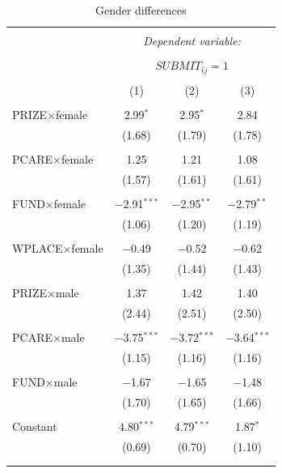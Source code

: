 \documentclass[12pt, titlepage]{article}
\begin{document}
\begin{table}
\centering
\caption{Gender differences}\label{tab: probability submitting interactions}
\begin{tabular}{@{\extracolsep{5pt}}lccc} 
\\[-1.8ex]\hline 
\hline \\[-1.8ex] 
 & \multicolumn{3}{c}{\textit{Dependent variable:}} \\ 
\cline{2-4} 
\\[-1.8ex] & \multicolumn{3}{c}{ $SUBMIT_{ij}=1$ } \\ 
\\[-1.8ex] & (1) & (2) & (3)\\ 
\hline \\[-1.8ex] 
 PRIZE$\times$female & 2.99$^{*}$ & 2.95$^{*}$ & 2.84 \\ 
  & (1.68) & (1.79) & (1.78) \\ 
  & & & \\ 
 PCARE$\times$female & 1.25 & 1.21 & 1.08 \\ 
  & (1.57) & (1.61) & (1.61) \\ 
  & & & \\ 
 FUND$\times$female & $-$2.91$^{***}$ & $-$2.95$^{**}$ & $-$2.79$^{**}$ \\ 
  & (1.06) & (1.20) & (1.19) \\ 
  & & & \\ 
 WPLACE$\times$female & $-$0.49 & $-$0.52 & $-$0.62 \\ 
  & (1.35) & (1.44) & (1.43) \\ 
  & & & \\ 
 PRIZE$\times$male & 1.37 & 1.42 & 1.40 \\ 
  & (2.44) & (2.51) & (2.50) \\ 
  & & & \\ 
 PCARE$\times$male & $-$3.75$^{***}$ & $-$3.72$^{***}$ & $-$3.64$^{***}$ \\ 
  & (1.15) & (1.16) & (1.16) \\ 
  & & & \\ 
 FUND$\times$male & $-$1.67 & $-$1.65 & $-$1.48 \\ 
  & (1.70) & (1.65) & (1.66) \\ 
  & & & \\ 
 Constant & 4.80$^{***}$ & 4.79$^{***}$ & 1.87$^{*}$ \\ 
  & (0.69) & (0.70) & (1.10) \\ 
  & & & \\ 
\hline \\[-1.8ex] 

\end{tabular}
\end{table}
\end{document}
